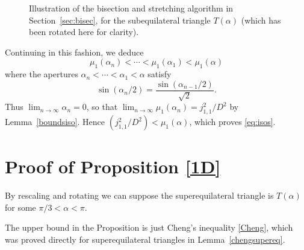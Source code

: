 \documentclass[11pt,reqno]{amsart}
\numberwithin{equation}{section}
\begin{document}
\begin{figure}[t]
  \begin{center}
\endpgfgraphicnamed
  \end{center}
  \caption{Illustration of the bisection and stretching algorithm in Section~\ref{sec:bisec}, for the subequilateral triangle $T(\alpha)$ (which has been rotated here for clarity). } \label{trigfig}
\end{figure}

Continuing in this fashion, we deduce
\[
\mu_1(\alpha_n) < \cdots < \mu_1(\alpha_1) < \mu_1(\alpha)
\]
where the apertures $\alpha_n < \cdots < \alpha_1 < \alpha$ satisfy
\[
\sin(\alpha_n/2) = \frac{\sin(\alpha_{n-1}/2)}{\sqrt{2}} .
\]
Thus $\lim_{n \to \infty} \alpha_n = 0$, so that $\lim_{n \to
\infty} \mu_1(\alpha_n) = j_{1,1}^2/D^2$  by
Lemma~\ref{boundsiso}. Hence $(j_{1,1}^2/D^2) < \mu_1(\alpha)$,
which proves \eqref{eq:isos}.

\section{\bf Proof of Proposition \ref{1D}}
By rescaling and rotating we can suppose the superequilateral triangle is $T(\alpha)$ for some $\pi/3<\alpha<\pi$.

The upper bound in the Proposition is just Cheng's inequality \eqref{Cheng}, which was proved directly for superequilateral triangles in Lemma~\ref{chengsupereq}.
\end{document}

